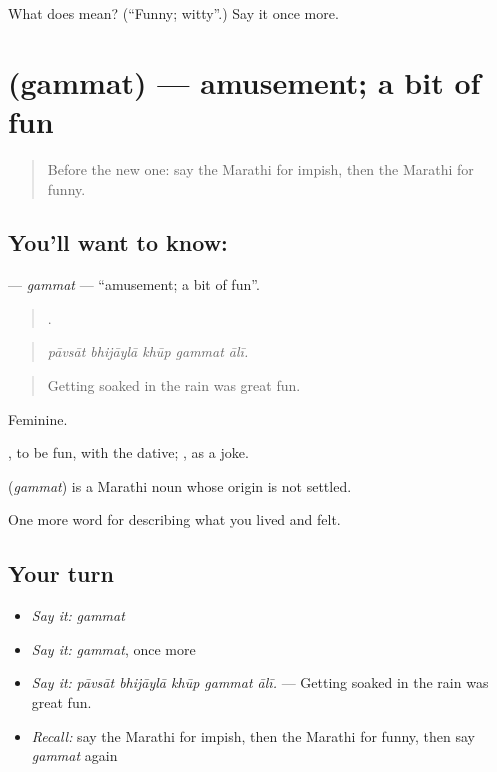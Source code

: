 \begin{tcolorbox}[breakable,colback=teal!4,colframe=teal!35!black,title={Before you move on}]
What does  mean? (\textquotedblleft{}Funny; witty\textquotedblright{}.) Say it once more.
\end{tcolorbox}
\section[\texorpdfstring{\mr{गंमत} (gammat)}{गंमत (gammat)}]{ (gammat) — amusement; a bit of fun}

\label{lesson:MR-C473-gammat}



\begin{quote}
Before the new one: say the Marathi for impish, then the Marathi for funny.
\end{quote}

\subsection*{You'll want to know: }
\textbf{} — \emph{gammat} — \textquotedblleft{}amusement; a bit of fun\textquotedblright{}.

\begin{quote}
    .
\end{quote}

\begin{quote}
\emph{pāvsāt bhijāylā khūp gammat ālī.}
\end{quote}

\begin{quote}
Getting soaked in the rain was great fun.
\end{quote}

Feminine.

 , to be fun, with the dative;  , as a joke.

\begin{cousinweb}
\textbf{} (\emph{gammat}) is a Marathi noun whose origin is not settled.
\end{cousinweb}

\begin{grammarlens}[title={What you've built}]
One more word for describing what you lived and felt.
\end{grammarlens}

\subsection*{Your turn}
\begin{itemize}
\raggedright
  \item \emph{Say it:} \emph{gammat}
  \item \emph{Say it:} \emph{gammat}, once more
  \item \emph{Say it:} \emph{pāvsāt bhijāylā khūp gammat ālī.} — Getting soaked in the rain was great fun.
  \item \emph{Recall:} say the Marathi for impish, then the Marathi for funny, then say \emph{gammat} again
\end{itemize}

